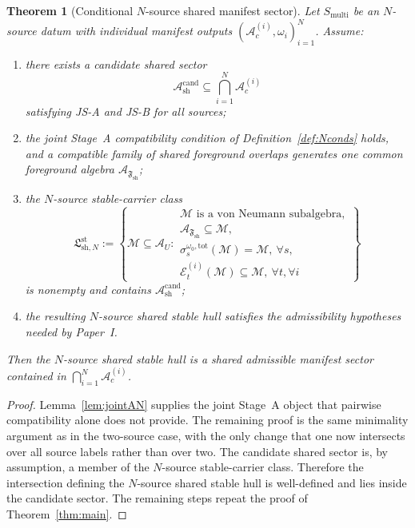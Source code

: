 \documentclass[12pt]{article}
\newtheorem{theorem}{Theorem}[section]
\theoremstyle{definition}
\theoremstyle{remark}
\begin{document}
\begin{theorem}[Conditional \(N\)-source shared manifest sector]
\label{thm:N}
Let \(S_{\mathrm{multi}}\) be an \(N\)-source datum with individual
manifest outputs \((\mathcal A_c^{(i)},\omega_i)_{i=1}^N\). Assume:
\begin{enumerate}
\item there exists a candidate shared sector
  \[
  \mathcal A_{\mathrm{sh}}^{\mathrm{cand}}
  \subseteq
  \bigcap_{i=1}^N \mathcal A_c^{(i)}
  \]
  satisfying JS-A and JS-B for all sources;
\item the joint Stage~A compatibility condition of
  Definition~\ref{def:Nconds} holds, and a compatible family of shared
  foreground overlaps generates one common foreground algebra
  \(\mathcal A_{\mathfrak F_{\mathrm{sh}}}\);
\item the \(N\)-source stable-carrier class
  \[
  \mathfrak L_{\mathrm{sh},N}^{\mathrm{st}}
  :=
  \left\{
  \mathcal M\subseteq\mathcal A_U:
  \begin{array}{l}
  \mathcal M \text{ is a von Neumann subalgebra},\\
  \mathcal A_{\mathfrak F_{\mathrm{sh}}}\subseteq \mathcal M,\\
  \sigma_s^{\omega_0,\mathrm{tot}}(\mathcal M)=\mathcal M,\ \forall s,\\
  \mathcal E_t^{(i)}(\mathcal M)\subseteq\mathcal M,\ \forall t,\forall i
  \end{array}
  \right\}
  \]
  is nonempty and contains
  \(\mathcal A_{\mathrm{sh}}^{\mathrm{cand}}\);
\item the resulting \(N\)-source shared stable hull satisfies the
  admissibility hypotheses needed by Paper~I.
\end{enumerate}
Then the \(N\)-source shared stable hull is a shared admissible manifest
sector contained in
\(\bigcap_{i=1}^N\mathcal A_c^{(i)}\).
\end{theorem}

\begin{proof}
Lemma~\ref{lem:jointAN} supplies the joint Stage~A object that pairwise
compatibility alone does not provide. The remaining proof is the same
minimality argument as in the two-source case,
with the only change that one now intersects over all source labels
rather than over two. The candidate shared sector is, by assumption, a
member of the \(N\)-source stable-carrier class. Therefore the
intersection defining the \(N\)-source shared stable hull is
well-defined and lies inside the candidate sector. The remaining steps
repeat the proof of Theorem~\ref{thm:main}.
\end{proof}
\end{document}
